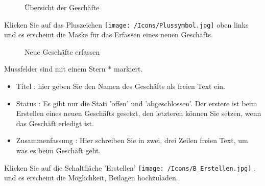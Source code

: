 
\begin{figure}[H]
\caption{Übersicht der Geschäfte}
\end{figure}

Klicken Sie auf das Pluszeichen \texttt{[image: /Icons/Plussymbol.jpg]}  oben links und es erscheint die Maske für das Erfassen eines neuen Geschäfts.

\begin{figure}[H]
\caption{Neue Geschäfte erfassen}
\end{figure}

Mussfelder sind mit einem Stern * markiert.

\begin{itemize}
\item
Titel : hier geben Sie den Namen des Geschäfts als freien Text ein.
\item 
Status : Es gibt nur die Stati 'offen' und 'abgeschlossen'. Der erstere ist beim Erstellen eines neuen Geschäfts gesetzt, den letzteren können Sie setzen, wenn das Geschäft erledigt ist.
\item
Zusammenfassung : Hier schreiben Sie in zwei, drei Zeilen freien Text, um was es beim Geschäft geht.
\end{itemize}

Klicken Sie auf die Schaltfläche 'Erstellen' \texttt{[image: /Icons/B\_Erstellen.jpg]} , und es erscheint die Möglichkeit, Beilagen hochzuladen.

